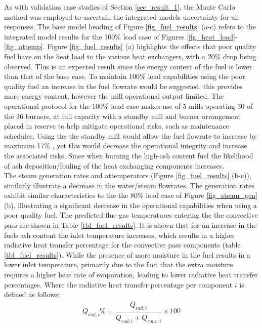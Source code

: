 \documentclass[a4paper,fleqn]{cas-dc}
\begin{document}
As with validation case studies of Section \ref{sec_result_1}, the Monte Carlo method was employed to ascertain the integrated models uncertainty for all responses. The base model heading of Figure \ref{fig_fuel_results} (a-c) refers to the integrated model results for the 100\% load case of Figures \ref{fig_heat_load}-\ref{fig_attemp}. Figure \ref{fig_fuel_results}  (a) highlights the effects that poor quality fuel have on the heat load to the various heat exchangers, with a 20\% drop being observed. This is an expected result since the energy content of the fuel is lower than that of the base case. To maintain 100\% load capabilities using the poor quality fuel an increase in the fuel flowrate would be suggested, this provides more energy content, however the mill operational output limited. The operational protocol for the 100\% load case makes use of 5 mills operating 30 of the 36 burners, at full capacity with a standby mill and burner arrangement placed in reserve to help mitigate operational risks, such as maintenance schedules. Using the the standby mill would allow the fuel flowrate to increase by maximum 17\% , yet this would decrease the operational integrity and increase the associated risks. Since when burning the high-ash content fuel the likelihood of ash deposition/fouling of the heat exchanging components increases.\\

The steam generation rates and attemperators (Figure \ref{fig_fuel_results} (b-c)), similarly illustrate a decrease in the water/steam flowrates. The generation rates exhibit similar characteristics to the the 80\% load case of Figure \ref{fig_steam_gen} (b), illustrating a significant decrease in the operational capabilities when using a poor quality fuel. The predicted flue-gas temperatures entering the the convective pass are shown in Table \ref{tbl_fuel_results}. It is shown that for an increase in the fuels ash content the inlet temperature increases, which results in a higher radiative heat transfer percentage for the convective pass components (table \ref{tbl_fuel_results}). While the presence of more moisture in the fuel results in a lower inlet temperature, primarily due to the fact that the extra moisture requires a higher heat rate of evaporation, leading to lower radiative heat transfer percentages. Where the radiative heat transfer percentage per component $i$ is defined as follows: \\
\begin{equation}
\dot{Q}_{rad,i}\% = \frac{\dot{Q}_{rad,i}}{\dot{Q}_{rad,i}+\dot{Q}_{conv,i}}\times 100
\end{equation}
\end{document}
